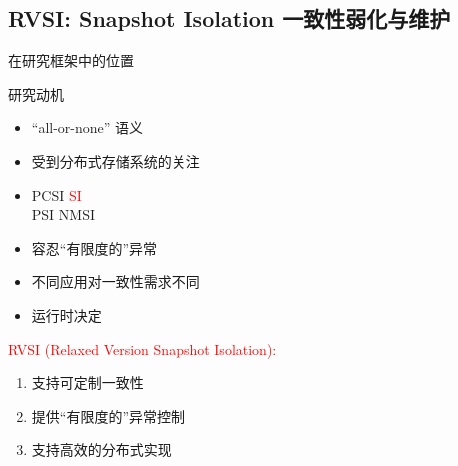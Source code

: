 \subsection{RVSI: Snapshot Isolation 一致性弱化与维护}

\begin{frame}{在研究框架中的位置}
\end{frame}

\begin{frame}{研究动机}
  \vspace{0.30cm}

  \begin{description}
    \setlength{\itemsep}{5pt}
    \item[分布式事务:] 
      \begin{itemize}
        \item ``all-or-none'' 语义
        \item 受到分布式存储系统的关注 
      \end{itemize}
    \item[弱一致性:] 
      \begin{itemize}
        \item PCSI  \textcolor{red}{SI}  \\
          PSI  NMSI  
        \end{itemize}
    \pause
    \item[\question{异常控制}:]
      \begin{itemize}
        \item 容忍``有限度的''异常 
      \end{itemize}
    \item[\question{可定制}:] 
      \begin{itemize}
        \item 不同应用对一致性需求不同 
        \item 运行时决定 
      \end{itemize}
  \end{description}
 
  \pause
  \vspace{0.30cm}
  \textcolor{red}{RVSI (Relaxed Version Snapshot Isolation):}
  \begin{enumerate}
    \item 支持可定制一致性 
    \item 提供``有限度的''异常控制 
    \item 支持高效的分布式实现
  \end{enumerate}
\end{frame}


